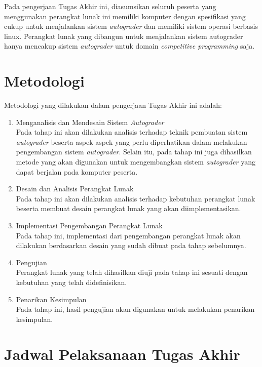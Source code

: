 \par Pada pengerjaan Tugas Akhir ini, diasumsikan seluruh peserta yang menggunakan perangkat lunak ini memiliki komputer dengan spesifikasi yang cukup untuk menjalankan sistem \textit{autograder} dan memiliki sistem operasi berbasis linux. Perangkat lunak yang dibangun untuk menjalankan sistem autograder hanya mencakup sistem \textit{autograder} untuk domain \textit{competitive programming} saja.

\section{Metodologi}

\par Metodologi yang dilakukan dalam pengerjaan Tugas Akhir ini adalah:
\begin{enumerate}
	\item Menganalisis dan Mendesain Sistem \textit{Autograder} \\ Pada tahap ini akan dilakukan analisis terhadap teknik pembuatan sistem \textit{autograder} beserta aspek-aspek yang perlu diperhatikan dalam melakukan pengembangan sistem \textit{autograder}. Selain itu, pada tahap ini juga dihasilkan metode yang akan digunakan untuk mengembangkan sistem \textit{autograder} yang dapat berjalan pada komputer peserta.
	\item Desain dan Analisis Perangkat Lunak \\ Pada tahap ini akan dilakukan analisis terhadap kebutuhan perangkat lunak beserta membuat desain perangkat lunak yang akan diimplementasikan.
	\item Implementasi Pengembangan Perangkat Lunak \\ Pada tahap ini, implementasi dari pengembangan perangkat lunak akan dilakukan berdasarkan desain yang sudah dibuat pada tahap sebelumnya.
	\item Pengujian \\ Perangkat lunak yang telah dihasilkan diuji pada tahap ini sesuati dengan kebutuhan yang telah didefinisikan.
	\item Penarikan Kesimpulan \\ Pada tahap ini, hasil pengujian akan digunakan untuk melakukan penarikan kesimpulan.
\end{enumerate}

\section{Jadwal Pelaksanaan Tugas Akhir}

